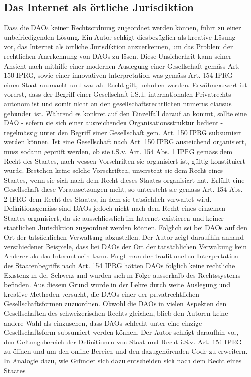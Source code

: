 \documentclass[a4paper,12pt]{report}
\begin{document}
    \subsection{Das Internet als örtliche Jurisdiktion}
	\startsubsection
	Dass die DAOs keiner Rechtsordnung zugeordnet werden können, führt zu einer unbefriedigenden Lösung. Ein Autor schlägt diesbezüglich als kreative Lösung vor, das Internet als örtliche Jurisdiktion anzuerkennen, um das Problem der rechtlichen Anerkennung von DAOs zu lösen. Diese Unsicherheit kann seiner Ansicht nach mithilfe einer modernen Auslegung einer Gesellschaft gemäss Art. 150 IPRG, sowie einer innovativen Interpretation was gemäss Art. 154 IPRG einen Staat ausmacht und was als Recht gilt, behoben werden. Erwähnenswert ist vorerst, dass der Begriff einer Gesellschaft i.S.d. internationalen Privatrechts autonom ist und somit nicht an den gesellschaftsrechtlichen numerus clausus gebunden ist. Während es konkret auf den Einzelfall darauf an kommt, sollte eine DAO - sofern sie sich einer ausreichenden Organisationsstruktur bedient - regelmässig unter den Begriff einer Gesellschaft gem. Art. 150 IPRG subsumiert werden können. Ist eine Gesellschaft nach Art. 150 IPRG ausreichend organisiert, muss sodann geprüft werden, ob sie i.S.v. Art. 154 Abs. 1 IPRG gemäss dem Recht des Staates, nach wessen Vorschriften sie organisiert ist, gültig konstituiert wurde. Bestehen keine solche Vorschriften, untersteht sie dem Recht eines Staates, wenn sie sich nach dem Recht dieses Staates organisiert hat. Erfüllt eine Gesellschaft diese Voraussetzungen nicht, so untersteht sie gemäss Art. 154 Abs. 2 IPRG dem Recht des Staates, in dem sie tatsächlich verwaltet wird. Definitionsgemäss sind DAOs jedoch nicht nach dem Recht eines einzelnen Staates organisiert, da sie ausschliesslich im Internet existieren und keiner staatlichen Jurisdiktion zugeordnet werden können. Folglich sei bei DAOs auf den Ort der tatsächlichen Verwaltung abzustellen. Der Autor zeigt daraufhin anhand verschiedener Beispiele, dass bei DAOs der Ort der tatsächlichen Verwaltung kein Anderer als das Internet sein kann. Folgt man der traditionellen Interpretation des Staatenbegriffs nach Art. 154 IPRG hätten DAOs folglich keine rechtliche Existenz in der Schweiz und würden sich in Folge ausserhalb des Rechtssystems befinden. Aus diesem Grund wurde in der Lehre durch weite Auslegung und kreative Methoden versucht, die DAOs einer der privatrechtlichen Gesellschaftsformen zuzuordnen. Obwohl die DAOs in vielen Aspekten den Gesellschaften des schweizerischen Rechts gleichen, blieb den Autoren keine andere Wahl als einzusehen, dass DAOs schlecht unter eine einzige Gesellschaftsform subsumiert werden können. Der Autor schlägt daraufhin vor, den Geltungsbereich der Definitionen von Staat und Recht i.S.v. Art. 154 IPRG zu öffnen und um den online-Bereich und den dazugehörenden Code zu erweitern. In Analogie dazu, wie Gründer sich dazu entscheiden sich nach dem Recht eines Staates 
\end{document}
